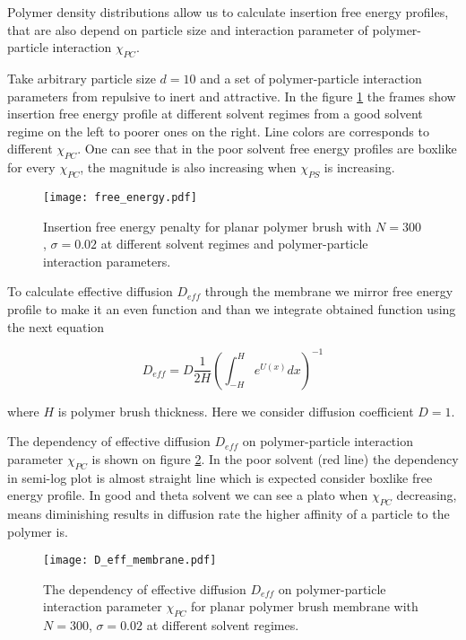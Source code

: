 \documentclass[12pt,a4paper]{article}
\begin{document}
Polymer density distributions allow us to calculate insertion free energy profiles, that are also depend on particle size and interaction parameter of polymer-particle interaction $\chi_{PC}$. 

Take arbitrary particle size $d=10$ and a set of polymer-particle interaction parameters from repulsive to inert and attractive. In the figure \ref{fig:fe_planar} the frames show insertion free energy profile at different solvent regimes from a good solvent regime on the left to poorer ones on the right. Line colors are corresponds to different $\chi_{PC}$. 
One can see that in the poor solvent free energy profiles are boxlike for every $\chi_{PC}$, the magnitude is also increasing when $\chi_{PS}$ is increasing.

\begin{figure}
    \center
    \texttt{[image: free\_energy.pdf]}
    \caption{Insertion free energy penalty for planar polymer brush with $N=300$, $\sigma = 0.02$ at different solvent regimes and polymer-particle interaction parameters.}
    \label{fig:fe_planar}
\end{figure}

To calculate effective diffusion $D_{eff}$ through the membrane we mirror free energy profile to make it an even function and than we integrate obtained function using the next equation

\begin{equation}
    D_{eff} = D \frac{1}{2H}\left(\int_{-H}^{H}e^{U(x)}dx\right)^{-1}
\end{equation}

where $H$ is polymer brush thickness. Here we consider diffusion coefficient $D=1$.

The dependency of effective diffusion $D_{eff}$ on polymer-particle interaction parameter $\chi_{PC}$ is shown on figure \ref{fig:D_eff_planar}. 
In the poor solvent (red line) the dependency in semi-log plot is almost straight line which is expected consider boxlike free energy profile. In good and theta solvent we can see a plato when $\chi_{PC}$ decreasing, means diminishing results in diffusion rate the higher affinity of a particle to the polymer is. 

\begin{figure}
    \center
    \texttt{[image: D\_eff\_membrane.pdf]}
    \caption{The dependency of effective diffusion $D_{eff}$ on polymer-particle interaction parameter $\chi_{PC}$ for planar polymer brush membrane with $N=300$, $\sigma = 0.02$ at different solvent regimes.}
    \label{fig:D_eff_planar}
\end{figure}
\end{document}
